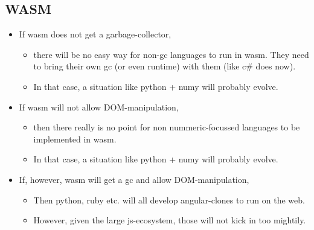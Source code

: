 \subsection{WASM}
\begin{itemize}
    \item If wasm does not get a garbage-collector, 
        \begin{itemize}
            \item there will be no easy way for non-gc languages to run in wasm. They need to bring their own gc (or even runtime) with them (like c\# does now). 
            \item In that case, a situation like python + numy will probably evolve.
        \end{itemize}
    \item If wasm will not allow DOM-manipulation, 
        \begin{itemize}
            \item then there really is no point for non nummeric-focussed languages to be implemented in wasm.
            \item In that case, a situation like python + numy will probably evolve.
        \end{itemize}
    \item If, however, wasm will get a gc and allow DOM-manipulation, 
        \begin{itemize}
            \item Then python, ruby etc. will all develop angular-clones to run on the web. 
            \item However, given the large js-ecosystem, those will not kick in too mightily. 
        \end{itemize}
\end{itemize}


